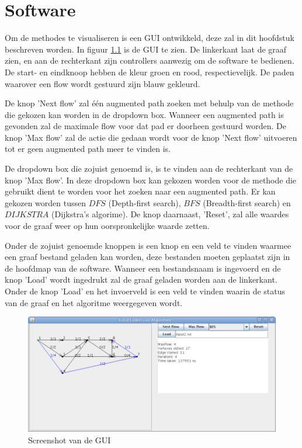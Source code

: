 \chapter{Software}
\label{chap:software}

Om de methodes te visualiseren is een GUI ontwikkeld, deze zal in dit hoofdstuk beschreven worden. In figuur \ref{fig:FFA} is de GUI te zien. De linkerkant laat de graaf zien, en aan de rechterkant zijn controllers aanwezig om de software te bedienen. De start- en eindknoop hebben de kleur groen en rood, respectievelijk. De paden waarover een flow wordt gestuurd zijn blauw gekleurd.

De knop 'Next flow' zal \'e\'en augmented path zoeken met behulp van de methode die gekozen kan worden in de dropdown box. Wanneer een augmented path is gevonden zal de maximale flow voor dat pad er doorheen gestuurd worden. De knop 'Max flow' zal de actie die gedaan wordt voor de knop 'Next flow' uitvoeren tot er geen augmented path meer te vinden is. 

De dropdown box die zojuist genoemd is, is te vinden aan de rechterkant van de knop 'Max flow'. In deze dropdown box kan gekozen worden voor de methode die gebruikt dient te worden voor het zoeken naar een augmented path. Er kan gekozen worden tussen $DFS$ (Depth-first search), $BFS$ (Breadth-first search) en $DIJKSTRA$ (Dijkstra's algorime). 
De knop daarnaast, 'Reset', zal alle waardes voor de graaf weer op hun oorspronkelijke waarde zetten.

Onder de zojuist genoemde knoppen is een knop en een veld te vinden waarmee een graaf bestand geladen kan worden, deze bestanden moeten geplaatst zijn in de hoofdmap van de software. Wanneer een bestandsnaam is ingevoerd en de knop 'Load' wordt ingedrukt zal de graaf geladen worden aan de linkerkant.
Onder de knop 'Load' en het invoerveld is een veld te vinden waarin de status van de graaf en het algoritme weergegeven wordt.

\begin{figure}[h]
	\includegraphics[width=\linewidth]{software/FFA}
	\centering
	\caption{Screenshot van de GUI}
	\label{fig:FFA}
\end{figure}

